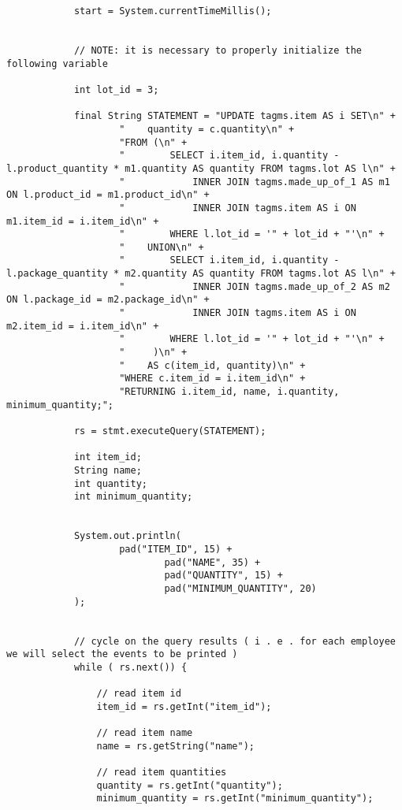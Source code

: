 \begin{lstlisting}
            start = System.currentTimeMillis();


            // NOTE: it is necessary to properly initialize the following variable

            int lot_id = 3;

            final String STATEMENT = "UPDATE tagms.item AS i SET\n" +
                    "    quantity = c.quantity\n" +
                    "FROM (\n" +
                    "        SELECT i.item_id, i.quantity - l.product_quantity * m1.quantity AS quantity FROM tagms.lot AS l\n" +
                    "            INNER JOIN tagms.made_up_of_1 AS m1 ON l.product_id = m1.product_id\n" +
                    "            INNER JOIN tagms.item AS i ON m1.item_id = i.item_id\n" +
                    "        WHERE l.lot_id = '" + lot_id + "'\n" +
                    "    UNION\n" +
                    "        SELECT i.item_id, i.quantity - l.package_quantity * m2.quantity AS quantity FROM tagms.lot AS l\n" +
                    "            INNER JOIN tagms.made_up_of_2 AS m2 ON l.package_id = m2.package_id\n" +
                    "            INNER JOIN tagms.item AS i ON m2.item_id = i.item_id\n" +
                    "        WHERE l.lot_id = '" + lot_id + "'\n" +
                    "     )\n" +
                    "    AS c(item_id, quantity)\n" +
                    "WHERE c.item_id = i.item_id\n" +
                    "RETURNING i.item_id, name, i.quantity, minimum_quantity;";

            rs = stmt.executeQuery(STATEMENT);

            int item_id;
            String name;
            int quantity;
            int minimum_quantity;


            System.out.println(
                    pad("ITEM_ID", 15) +
                            pad("NAME", 35) +
                            pad("QUANTITY", 15) +
                            pad("MINIMUM_QUANTITY", 20)
            );


            // cycle on the query results ( i . e . for each employee we will select the events to be printed )
            while ( rs.next()) {

                // read item id
                item_id = rs.getInt("item_id");

                // read item name
                name = rs.getString("name");

                // read item quantities
                quantity = rs.getInt("quantity");
                minimum_quantity = rs.getInt("minimum_quantity");



\end{lstlisting}
